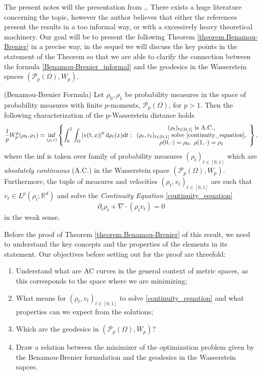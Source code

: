 The present notes will the presentation from \cite{ambrosio2008gradient},\cite{santambrogio2015optimal}. There exists a huge literature concerning the topic, however the author believes that either the references present the results in a too informal way, or with a excessively heavy theoretical machinery. Our goal will be to present the following Theorem \ref{theorem.Benamou-Brenier} in a precise way, in the sequel we will discuss the key points in the statement of the Theorem so that we are able to clarify the connection between the formula \eqref{Benamou-Brenier_informal} and the geodesics in the Wasserstein spaces $\left(\mathcal{P}_p(\Omega), W_p\right)$. 
\begin{theorem}{(Benamou-Brenier Formula)}
	\label{theorem.Benamou-Brenier}
	Let $\rho_0, \rho_1$ be probability measures in the space of probability measures with finite $p$-moments, $\mathcal{P}_p(\Omega)$, for $p>1$. Then the following characterization of the p-Wasserstein distance holds
	\begin{equation*}
	\frac{1}{p}W^p_p(\rho_0, \rho_1) 
	= 
	\mathop{\rm inf}_{(\rho, v)}
	\left\{
	\int_0^1\int_{\Omega}\left|v(t,x)\right|^p {\rm d} \rho_t(x){\rm d} t: 
	\begin{array}{c}
	(\rho_t)_{t \in [0,1]} \text{ is A.C.}, \\
	(\rho_t, v_t)_{t \in [0,1]} \text{ solve \eqref{continuity_equation}},\\
	\rho(0,\cdot) = \rho_0, \ \rho(1, \cdot) = \rho_1 
	\end{array}
	\right\},
	\end{equation*}
	where the inf is taken over family of probability measures $(\rho_t)_{t \in [0,1]}$ which are {\em absolutely continuous} (A.C.) in the Wasserstein space $\left(\mathcal{P}_p(\Omega), W_p\right)$. Furthermore, the tuple of measures and velocities $(\rho_t, v_t)_{t \in [0,1]}$ are such that $v_t \in L^p(\rho_t;\mathbb{R}^d)$ and solve the {\em Continuity Equation} \eqref{continuity_equation} 
	\begin{equation}
	\label{continuity_equation}
	\tag{CE}
	\partial_t \rho_t + \nabla\cdot\left(\rho_t v_t\right) = 0
	\end{equation}
	in the weak sense. 
\end{theorem} 

Before the proof of Theorem \eqref{theorem.Benamou-Brenier} of this result, we need to understand the key concepts and the properties of the elements in its statement. Our objectives before setting out for the proof are threefold:
\begin{enumerate}
	\item Understand what are AC curves in the general context of metric spaces, as this corresponds to the space where we are minimizing; 
	\item What means for $(\rho_t, v_t)_{t \in [0,1]}$ to solve \eqref{continuity_equation} and what properties can we expect from the solutions;
	\item Which are the geodesics in $(\mathcal{P}_p(\Omega), W_p)$? 
	\item Draw a relation between the minimizer of the optimization problem given by the Benamou-Brenier formulation and the geodesics in the Wasserstein sapces. 
\end{enumerate} 

